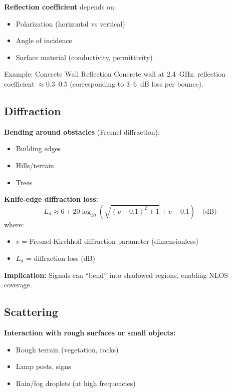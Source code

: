 \textbf{Reflection coefficient} depends on:
\begin{itemize}
\item Polarization (horizontal vs vertical)
\item Angle of incidence
\item Surface material (conductivity, permittivity)
\end{itemize}

\begin{calloutbox}{Example: Concrete Wall Reflection}
Concrete wall at 2.4~GHz: reflection coefficient $\approx 0.3$--$0.5$ (corresponding to 3--6~dB loss per bounce).
\end{calloutbox}

\subsection{Diffraction}

\textbf{Bending around obstacles} (Fresnel diffraction):
\begin{itemize}
\item Building edges
\item Hills/terrain
\item Trees
\end{itemize}

\textbf{Knife-edge diffraction loss:}
\begin{equation}
L_d \approx 6 + 20\log_{10}\left(\sqrt{(v-0.1)^2 + 1} + v - 0.1\right) \quad \text{(dB)}
\label{eq:knife-edge-diffraction}
\end{equation}
where:
\begin{itemize}
\item $v$ = Fresnel-Kirchhoff diffraction parameter (dimensionless)
\item $L_d$ = diffraction loss (dB)
\end{itemize}

\textbf{Implication:} Signals can ``bend'' into shadowed regions, enabling NLOS coverage.

\subsection{Scattering}

\textbf{Interaction with rough surfaces or small objects:}
\begin{itemize}
\item Rough terrain (vegetation, rocks)
\item Lamp posts, signs
\item Rain/fog droplets (at high frequencies)
\end{itemize}

